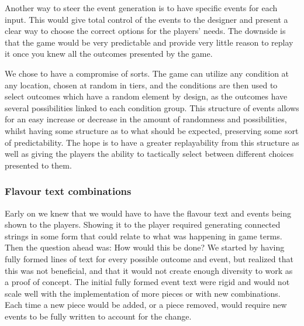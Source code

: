 Another way to steer the event generation is to have specific events for each input. This would give total control of the events to the designer and present a clear way to choose the correct options for the players' needs.
The downside is that the game would be very predictable and provide very little reason to replay it once you knew all the outcomes presented by the game.

We chose to have a compromise of sorts. The game can utilize any condition at any location, chosen at random in tiers, and the conditions are then used to select outcomes which have a random element by design, as the outcomes have several possibilities linked to each condition group.
This structure of events allows for an easy increase or decrease in the amount of randomness and possibilities, whilst having some structure as to what should be expected, preserving some sort of predictability. The hope is to have a greater replayability from this structure as well as giving the players the ability to tactically select between different choices presented to them.

\subsubsection{Flavour text combinations}
Early on we knew that we would have to have the flavour text and events being shown to the players. Showing it to the player required generating connected strings in some form that could relate to what was happening in game terms.
Then the question ahead was: How would this be done?
We started by having fully formed lines of text for every possible outcome and event, but realized that this was not beneficial, and that it would not create enough diversity to work as a proof of concept. 
The initial fully formed event text were rigid and would not scale well with the implementation of more pieces or with new combinations. Each time a new piece would be added, or a piece removed, would require new events to be fully written to account for the change. 

